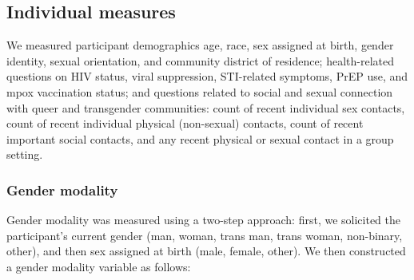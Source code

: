 \documentclass[
  letterpaper,
  DIV=11,
  numbers=noendperiod,
  oneside]{scrreprt}
\begin{document}
\hypertarget{individual-measures}{%
\subsection{Individual measures}\label{individual-measures}}

We measured participant demographics age, race, sex assigned at birth,
gender identity, sexual orientation, and community district of
residence; health-related questions on HIV status, viral suppression,
STI-related symptoms, PrEP use, and mpox vaccination status; and
questions related to social and sexual connection with queer and
transgender communities: count of recent individual sex contacts, count
of recent individual physical (non-sexual) contacts, count of recent
important social contacts, and any recent physical or sexual contact in
a group setting.

\hypertarget{gender-modality}{%
\subsubsection{Gender modality}\label{gender-modality}}

Gender modality was measured using a two-step approach: first, we
solicited the participant's current gender (man, woman, trans man, trans
woman, non-binary, other), and then sex assigned at birth (male, female,
other). We then constructed a gender modality variable as follows:
\end{document}
